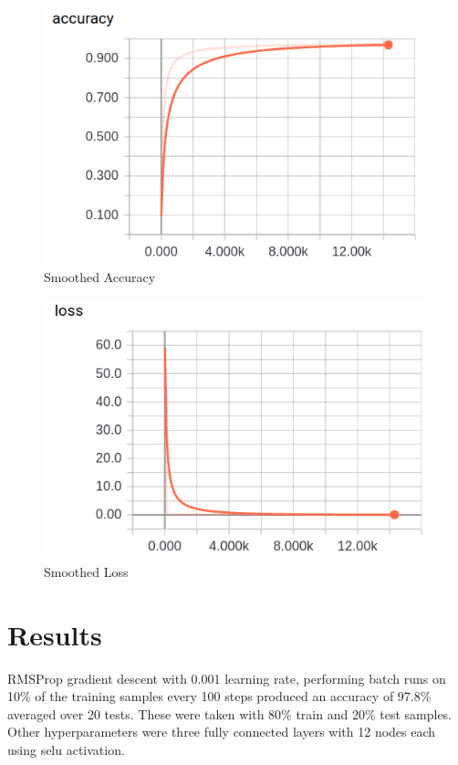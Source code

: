 \documentclass{article}
\begin{document}
  \begin{figure}[H]
  \caption{Smoothed Accuracy}\label{img:acc_smooth}
  \begin{center}
  \includegraphics[scale=0.65]{../images/acc}
  \end{center}
  \end{figure}
  \begin{figure}[H]
  \caption{Smoothed Loss}\label{img:loss_smooth}
  \begin{center}
  \includegraphics[scale=0.65]{../images/loss}
  \end{center}
  \end{figure}




\newpage
\section{Results}\label{sec:results}
  RMSProp gradient descent with 0.001 learning rate, performing batch runs on 
  10\% of the training samples every 100 steps produced an accuracy of 97.8\% 
  averaged over 20 tests. These were taken with 80\% train and 20\% test 
  samples. Other hyperparameters were three fully connected layers with 12 
  nodes each using selu activation. 
\end{document}
